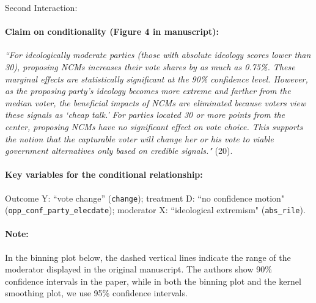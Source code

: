 \documentclass[12pt]{article}
\begin{document}
\clearpage


\noindent Second Interaction:

\paragraph{Claim on conditionality (Figure 4 in manuscript):} \emph{``For ideologically moderate parties (those with absolute ideology scores lower than 30), proposing NCMs increases their vote shares by as much as 0.75\%. These marginal effects are statistically significant at the 90\% confidence level. However, as the proposing party's ideology becomes more extreme and farther from the median voter, the beneficial impacts of NCMs are eliminated because voters view these signals as `cheap talk.' For parties located 30 or more points from the center, proposing NCMs have no significant effect on vote choice. This supports the notion that the capturable voter will change her or his vote to viable government alternatives only based on credible signals."} (20). 

\paragraph{Key variables for the conditional relationship:} Outcome Y:
``vote change'' (\texttt{change}); treatment D: ``no confidence motion" (\texttt{opp\_conf\_party\_elecdate}); moderator X: ``ideological extremism"
(\texttt{abs\_rile}).

\paragraph{Note:} In the binning plot below, the dashed vertical lines indicate the range of the moderator displayed in the original manuscript. The authors show 90\% confidence intervals in the paper, while in both the binning plot and the kernel smoothing plot, we use 95\% confidence intervals.


\newpage
\end{document}
